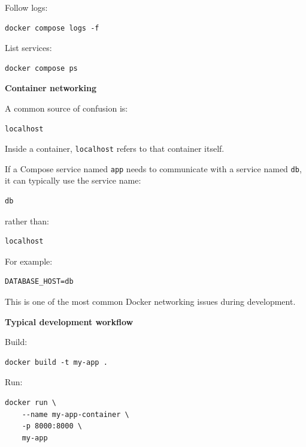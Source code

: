 \documentclass[11pt,letterpaper]{article}
\begin{document}
Follow logs:

\begin{lstlisting}
docker compose logs -f
\end{lstlisting}

List services:

\begin{lstlisting}
docker compose ps
\end{lstlisting}



\textbf{Container networking}

A common source of confusion is:

\begin{lstlisting}
localhost
\end{lstlisting}

Inside a container, \texttt{localhost} refers to that container itself.

If a Compose service named \texttt{app} needs to communicate with a service
named \texttt{db}, it can typically use the service name:

\begin{lstlisting}
db
\end{lstlisting}

rather than:

\begin{lstlisting}
localhost
\end{lstlisting}

For example:

\begin{lstlisting}
DATABASE_HOST=db
\end{lstlisting}

This is one of the most common Docker networking issues during development.



\textbf{Typical development workflow}

Build:

\begin{lstlisting}
docker build -t my-app .
\end{lstlisting}

Run:

\begin{lstlisting}
docker run \
    --name my-app-container \
    -p 8000:8000 \
    my-app
\end{lstlisting}
\end{document}
